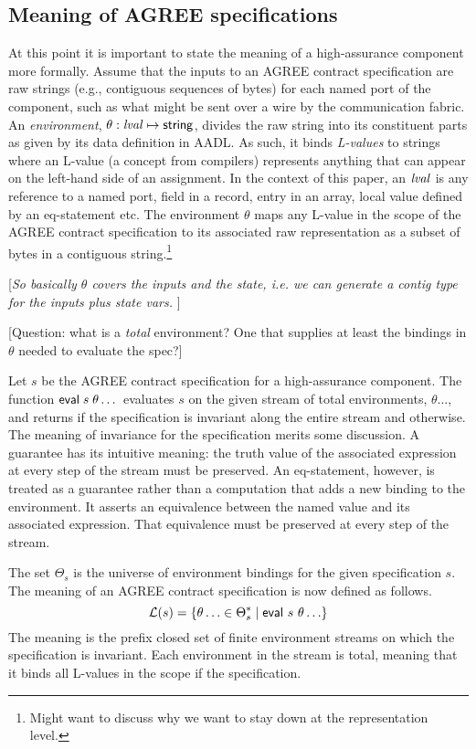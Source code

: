 \subsection{Meaning of AGREE specifications}

At this point it is important to state the meaning of a high-assurance
component more formally. Assume that the inputs to an AGREE contract
specification are raw strings (e.g., contiguous sequences of bytes)
for each named port of the component, such as what might be sent over
a wire by the communication fabric. An \emph{environment},
$\theta: \mathit{lval} \mapsto \mathsf{string}$, divides the raw string into
its constituent parts as given by its data definition in AADL. As
such, it binds \emph{L-values} to strings where an L-value (a concept
from compilers) represents anything that can appear on the left-hand
side of an assignment. In the context of this paper, an $\mathit{lval}$ is any
reference to a named port, field in a record, entry in an array, local
value defined by an eq-statement etc. The environment $\theta$ maps
any L-value in the scope of the AGREE contract specification to its
associated raw representation as a subset of bytes in a contiguous
string.\footnote{Might want to discuss why we want to stay down at the
representation level.}

[\emph{So basically $\theta$ covers the inputs and the state, i.e. we can
generate a contig type for the inputs plus state vars.} ]

[Question: what is a \emph{total} environment? One that supplies at
least the bindings in $\theta$ needed to evaluate the spec?]

Let $s$ be the AGREE contract specification for a high-assurance
component. The function $\mathsf{eval}\; s\; \theta\dots$ evaluates $s$
on the given stream of total environments, $\theta\dots$, and
returns  if the specification is invariant along the
entire stream and  otherwise. The meaning of invariance
for the specification merits some discussion. A guarantee has its
intuitive meaning: the truth value of the associated expression at
every step of the stream must be preserved. An eq-statement, however,
is treated as a guarantee rather than a computation that adds a new
binding to the environment. It asserts an equivalence between the
named value and its associated expression. That equivalence must be
preserved at every step of the stream.

The set $\Theta_s$ is the universe of environment bindings for the
given specification $s$.  The meaning of an AGREE contract
specification is now defined as follows.
%
\[
  \mathcal{L}(s) = \{ {\theta\ldots \in \Theta_s^* \mid \mathsf{eval}\ s\ \theta\ldots} \}
\]
%
The meaning is the prefix closed set of finite environment streams on
which the specification is invariant. Each environment in the stream
is total, meaning that it binds all L-values in the scope if the
specification.

